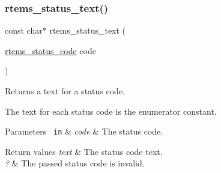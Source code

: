 \subsubsection{\texorpdfstring{rtems\_status\_text()}{rtems\_status\_text()}}
{\footnotesize\ttfamily const char$\ast$ rtems\+\_\+status\+\_\+text (\begin{DoxyParamCaption}\item[{\mbox{\hyperlink{group__ClassicStatus_ga545d41846817eaba6143d52ee4d9e9fe}{rtems\+\_\+status\+\_\+code}}}]{code }\end{DoxyParamCaption})}



Returns a text for a status code. 

The text for each status code is the enumerator constant.


\begin{DoxyParams}[1]{Parameters}
\mbox{\texttt{ in}}  & {\em code} & The status code.\\
\hline
\end{DoxyParams}

\begin{DoxyRetVals}{Return values}
{\em text} & The status code text. \\
\hline
{\em ?} & The passed status code is invalid. \\
\hline
\end{DoxyRetVals}
